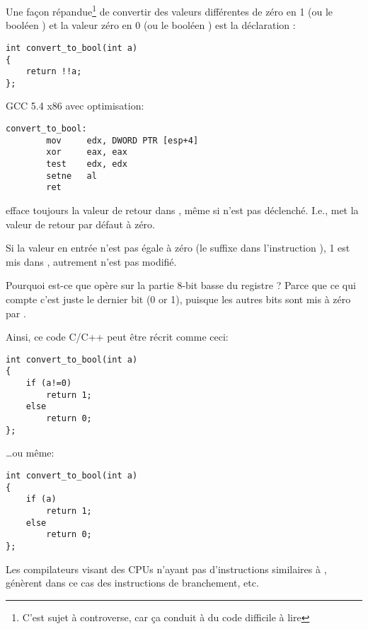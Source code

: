 
Une façon répandue\footnote{C'est sujet à controverse, car ça conduit à du code difficile
à lire} de convertir des valeurs différentes de zéro en 1 (ou le booléen )
et la valeur zéro en 0 (ou le booléen ) est la déclaration :

\begin{lstlisting}[style=customc]
int convert_to_bool(int a)
{
	return !!a;
};
\end{lstlisting}

GCC 5.4 x86 avec optimisation:

\begin{lstlisting}[style=customasmx86]
convert_to_bool:
        mov     edx, DWORD PTR [esp+4]
        xor     eax, eax
        test    edx, edx
        setne   al
        ret
\end{lstlisting}

 efface toujours la valeur de retour dans \EAX, même si  n'est
pas déclenché. I.e.,  met la valeur de retour par défaut à zéro.

Si la valeur en entrée n'est pas égale à zéro (le suffixe  dans l'instruction
), 1 est mis dans \AL, autrement \AL n'est pas modifié.

Pourquoi est-ce que  opère sur la partie 8-bit basse du registre \EAX?
Parce que ce qui compte c'est juste le dernier bit (0 or 1), puisque les autres bits
sont mis à zéro par .

Ainsi, ce code C/C++ peut être récrit comme ceci:

\begin{lstlisting}[style=customc]
int convert_to_bool(int a)
{
	if (a!=0)
		return 1;
	else
		return 0;
};
\end{lstlisting}

\dots ou même:

\begin{lstlisting}[style=customc]
int convert_to_bool(int a)
{
	if (a)
		return 1;
	else
		return 0;
};
\end{lstlisting}

Les compilateurs visant des \ac{CPU}s n'ayant pas d'instructions similaires à ,
génèrent dans ce cas des instructions de branchement, etc.
